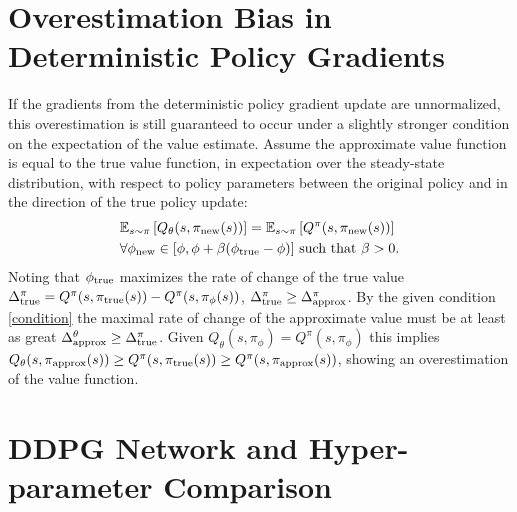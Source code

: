 \documentclass{article}
\newcommand{\E}{\mathbb{E}}
\newcommand{\lb}{\left [}
\newcommand{\rb}{\right ]}
\begin{document}
\section{Overestimation Bias in Deterministic Policy Gradients} \label{sec:sm_over}

If the gradients from the deterministic policy gradient update are unnormalized, this overestimation is still guaranteed to occur under a slightly stronger condition on the expectation of the value estimate. Assume the approximate value function is equal to the true value function, in expectation over the steady-state distribution, with respect to policy parameters between the original policy and in the direction of the true policy update:
\begin{equation}
\begin{aligned}
\label{condition}
& \E_{s \sim \pi} \lb Q_\theta(s, \pi_\textnormal{new}(s))\rb = \E_{s \sim \pi} \lb Q^\pi(s, \pi_\textnormal{new}(s)) \rb \\
& \forall \phi_\textnormal{new} \in [\phi,\phi + \beta (\phi_{\textnormal{true}} - \phi)] \text{ such that } \beta > 0.
\end{aligned}
\end{equation}
Noting that $\phi_{\textnormal{true}}$ maximizes the rate of change of the true value $\Delta^\pi_{\textnormal{true}} = Q^\pi(s,\pi_\textnormal{true}(s)) - Q^\pi(s,\pi_\phi(s))$, $\Delta^\pi_{\textnormal{true}} \geq \Delta^\pi_{\textnormal{approx}}$. By the given condition \ref{condition} the maximal rate of change of the approximate value must be at least as great $\Delta^\theta_{\textnormal{approx}} \geq \Delta^\pi_{\textnormal{true}}$. Given $Q_\theta(s, \pi_\phi) = Q^\pi(s, \pi_\phi)$ this implies $Q_\theta(s,\pi_\textnormal{approx}(s)) \geq Q^\pi(s,\pi_\textnormal{true}(s)) \geq Q^\pi(s,\pi_\textnormal{approx}(s))$, showing an overestimation of the value function.

\clearpage
\section{DDPG Network and Hyper-parameter Comparison}
\label{sec:sm_hyp}
\end{document}
